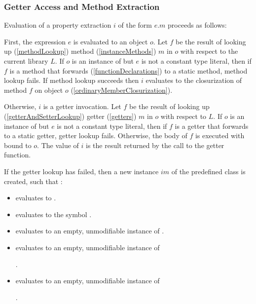 \documentclass{article}
\begin{document}
\subsubsection{Getter Access and Method Extraction}

\LMHash{}
Evaluation of a property extraction $i$ of the form $e.m$ proceeds as follows:

\LMHash{}
First, the expression $e$ is evaluated to an object $o$.
Let $f$ be the result of looking up (\ref{methodLookup}) method (\ref{instanceMethods}) $m$ in $o$ with respect to the current library $L$.
If $o$ is an instance of  but $e$ is not a constant type literal, then if $f$ is a method that forwards (\ref{functionDeclarations}) to a static method, method lookup fails.
If method lookup succeeds then $i$ evaluates to the closurization of method $f$ on object $o$ (\ref{ordinaryMemberClosurization}).


\LMHash{}
Otherwise, $i$ is a getter invocation.
Let $f$ be the result of looking up (\ref{getterAndSetterLookup}) getter (\ref{getters}) $m$ in $o$ with respect to $L$.
If $o$ is an instance of  but $e$ is not a constant type literal, then if $f$ is a getter that forwards to a static getter, getter lookup fails.
Otherwise, the body of $f$ is executed with \THIS{} bound to $o$.
The value of $i$ is the result returned by the call to the getter function.

\LMHash{}
If the getter lookup has failed, then a new instance $im$ of the predefined class  is created, such that :
\begin{itemize}
\item {} evaluates to \code{\TRUE{}}.
\item {} evaluates to the symbol .
\item {} evaluates to an empty, unmodifiable instance of
.
\item {} evaluates to an empty, unmodifiable instance of

.
\item {} evaluates to an empty, unmodifiable instance of

.
\end{itemize}
\end{document}
